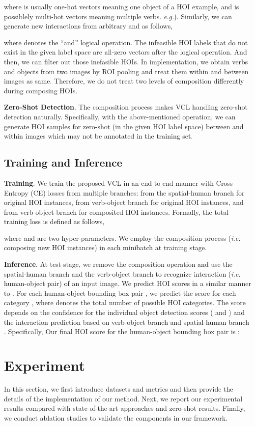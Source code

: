 \documentclass[runningheads]{llncs}
\newcommand{\ie}{\textit{i.e. }}
\newcommand{\eg}{\textit{e.g.}}
\begin{document}
where  is usually one-hot vectors meaning one object of a HOI example, and  is possiblely multi-hot vectors meaning multiple verbs. \eg ). Similarly, we can generate new interactions from arbitrary  and  as follows,



where  denotes the ``and'' logical operation. The infeasible HOI labels that do not exist in the given label space are all-zero vectors after the logical operation. And then, we can filter out those inefasible HOIs. In implementation, we obtain verbs and objects from two images by ROI pooling and treat them within and between images as same. Therefore, we do not treat two levels of composition differently during composing HOIs.


\textbf{Zero-Shot Detection}. The composition process makes VCL handling zero-shot detection naturally. Specifically, with the above-mentioned operation, we can generate HOI samples for zero-shot (in the given HOI label space) between and within images which may not be annotated in the training set.


\subsection{Training and Inference}
\textbf{Training}. We train the proposed VCL in an end-to-end manner with Cross Entropy (CE) losses from multiple branches:  from the spatial-human branch for original HOI instances,  from verb-object branch for original HOI instances, and  from verb-object branch for composited HOI instances. Formally, the total training loss is defined as follows,

where  and  are two hyper-parameters. We employ the composition process (\ie composing new HOI instances) in each minibatch at training stage.

\textbf{Inference}. At test stage, we remove the composition operation and use the spatial-human branch and the verb-object branch to recognize interaction (\ie human-object pair) of an input image. We predict HOI scores in a similar manner to \cite{gao2018ican}. For each human-object bounding box pair , we predict the score  for each category , where  denotes the total number of possible HOI categories. The score  depends on the confidence for the individual object detection scores ( and ) and the interaction prediction based on verb-object branch  and spatial-human branch . Specifically, Our final HOI score  for the human-object bounding box pair  is :


\section{Experiment}
In this section, we first introduce datasets and metrics and then provide the details of the implementation of our method. Next, we report our experimental results compared with state-of-the-art approaches and zero-shot results. Finally, we conduct ablation studies to validate the components in our framework.
\end{document}
